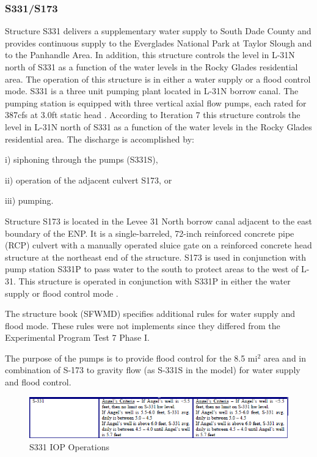 \clearpage
\subsubsection{S331/S173}
Structure S331 delivers a supplementary water supply to South Dade County and provides continuous supply to the Everglades National Park at Taylor Slough and to the Panhandle Area. In addition, this structure controls the level in L-31N north of S331 as a function of the water levels in the Rocky Glades residential area. The operation of this structure is in either a water supply or a flood control mode. S331 is a three unit pumping plant located in L-31N borrow canal. The pumping station is equipped with three vertical axial flow pumps, each rated for 387cfs at 3.0ft static head \cite{SFWMD1994}. According to Iteration 7 this structure controls the level in L-31N north of S331 as a function of the water levels in the Rocky Glades residential area\cite{SFWMD1994}.  The discharge is accomplished by:

\begin{packed_items}
\item i) siphoning through the pumps (S331S),
\item ii) operation of the adjacent culvert S173, or
\item iii) pumping.
\end{packed_items}

Structure S173 is located in the Levee 31 North borrow canal adjacent to the east boundary of the ENP. It is a single-barreled, 72-inch reinforced concrete pipe (RCP) culvert with a manually operated sluice gate on a reinforced concrete head structure at the northeast end of the structure. S173 is used in conjunction with pump station S331P to pass water to the south to protect areas to the west of L-31. This structure is operated in conjunction with S331P in either the water supply or flood control mode .

The structure book (SFWMD) specifies additional rules for water supply and flood mode. These rules were not implements since they differed from the Experimental Program Test 7 Phase I.

The purpose of the pumps is to provide flood control for the 8.5 mi$^2$ area and in combination of S-173 to gravity flow (as S-331S in the model) for water supply and flood control.

\begin{figure}[!h]
  \begin{center}
  \includegraphics[width=6.5in]{../figs/S331_IOPops.png}
  \caption{S331 IOP Operations}
  \label{fig:S331iop}
  \end{center}
\end{figure}


